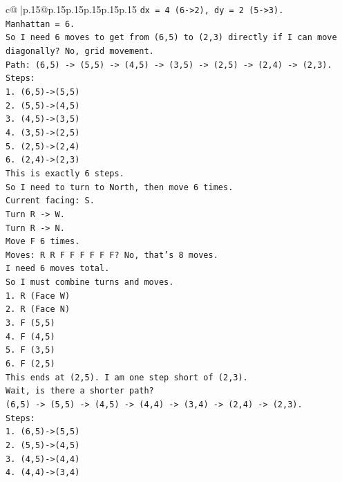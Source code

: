 \documentclass{article}
\begin{document}
{\begin{supertabular}{c@{$\;$}|p{.15\linewidth}@{}p{.15\linewidth}p{.15\linewidth}p{.15\linewidth}p{.15\linewidth}p{.15\linewidth}}
{{{\texttt{dx = 4 (6{-}>2), dy = 2 (5{-}>3).} \\
\texttt{Manhattan = 6.} \\
\texttt{So I need 6 moves to get from (6,5) to (2,3) directly if I can move diagonally? No, grid movement.} \\
\texttt{Path: (6,5) {-}> (5,5) {-}> (4,5) {-}> (3,5) {-}> (2,5) {-}> (2,4) {-}> (2,3).} \\
\texttt{Steps:} \\
\texttt{1. (6,5){-}>(5,5)} \\
\texttt{2. (5,5){-}>(4,5)} \\
\texttt{3. (4,5){-}>(3,5)} \\
\texttt{4. (3,5){-}>(2,5)} \\
\texttt{5. (2,5){-}>(2,4)} \\
\texttt{6. (2,4){-}>(2,3)} \\
\texttt{This is exactly 6 steps.} \\
\texttt{So I need to turn to North, then move 6 times.} \\
\texttt{Current facing: S.} \\
\texttt{Turn R {-}> W.} \\
\texttt{Turn R {-}> N.} \\
\texttt{Move F 6 times.} \\
\texttt{Moves: R R F F F F F F? No, that's 8 moves.} \\
\texttt{I need 6 moves total.} \\
\texttt{So I must combine turns and moves.} \\
\texttt{1. R (Face W)} \\
\texttt{2. R (Face N)} \\
\texttt{3. F (5,5)} \\
\texttt{4. F (4,5)} \\
\texttt{5. F (3,5)} \\
\texttt{6. F (2,5)} \\
\texttt{This ends at (2,5). I am one step short of (2,3).} \\
\texttt{Wait, is there a shorter path?} \\
\texttt{(6,5) {-}> (5,5) {-}> (4,5) {-}> (4,4) {-}> (3,4) {-}> (2,4) {-}> (2,3).} \\
\texttt{Steps:} \\
\texttt{1. (6,5){-}>(5,5)} \\
\texttt{2. (5,5){-}>(4,5)} \\
\texttt{3. (4,5){-}>(4,4)} \\
\texttt{4. (4,4){-}>(3,4)} \\
}}}
\end{supertabular}}
\end{document}

